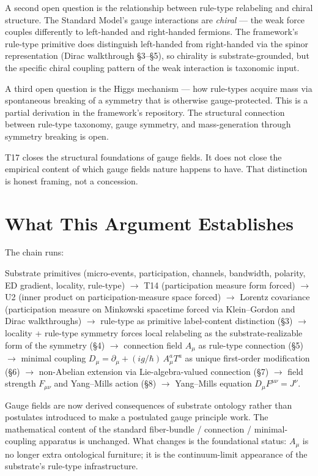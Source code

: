 \documentclass[11pt,a4paper]{article}
\begin{document}
A second open question is the relationship between rule-type relabeling and chiral structure. The Standard Model's gauge interactions are \emph{chiral} --- the weak force couples differently to left-handed and right-handed fermions. The framework's rule-type primitive does distinguish left-handed from right-handed via the spinor representation (Dirac walkthrough \S3--\S5), so chirality is substrate-grounded, but the specific chiral coupling pattern of the weak interaction is taxonomic input.

A third open question is the Higgs mechanism --- how rule-types acquire mass via spontaneous breaking of a symmetry that is otherwise gauge-protected. This is a partial derivation in the framework's repository. The structural connection between rule-type taxonomy, gauge symmetry, and mass-generation through symmetry breaking is open.

T17 closes the structural foundations of gauge fields. It does not close the empirical content of which gauge fields nature happens to have. That distinction is honest framing, not a concession.

\section{What This Argument Establishes}

The chain runs:

Substrate primitives (micro-events, participation, channels, bandwidth, polarity, ED gradient, locality, rule-type) $\to$ T14 (participation measure form forced) $\to$ U2 (inner product on participation-measure space forced) $\to$ Lorentz covariance (participation measure on Minkowski spacetime forced via Klein--Gordon and Dirac walkthroughs) $\to$ rule-type as primitive label-content distinction (\S3) $\to$ locality + rule-type symmetry forces local relabeling as the substrate-realizable form of the symmetry (\S4) $\to$ connection field $A_\mu$ as rule-type connection (\S5) $\to$ minimal coupling $D_\mu = \partial_\mu + (ig/\hbar)\, A_\mu^a T^a$ as unique first-order modification (\S6) $\to$ non-Abelian extension via Lie-algebra-valued connection (\S7) $\to$ field strength $F_{\mu\nu}$ and Yang--Mills action (\S8) $\to$ Yang--Mills equation $D_\mu F^{\mu\nu} = J^\nu$.

Gauge fields are now derived consequences of substrate ontology rather than postulates introduced to make a postulated gauge principle work. The mathematical content of the standard fiber-bundle / connection / minimal-coupling apparatus is unchanged. What changes is the foundational status: $A_\mu$ is no longer extra ontological furniture; it is the continuum-limit appearance of the substrate's rule-type infrastructure.
\end{document}
